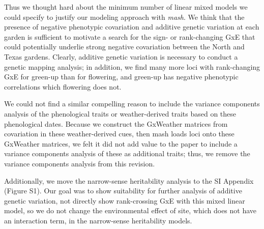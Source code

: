 \documentclass[
  letterpaper,
  DIV=11,
  numbers=noendperiod]{scrartcl}
\begin{document}
Thus we thought hard about the minimum number of linear mixed models we
could specify to justify our modeling approach with \emph{mash}. We
think that the presence of negative phenotypic covariation and additive
genetic variation at each garden is sufficient to motivate a search for
the sign- or rank-changing GxE that could potentially underlie strong
negative covariation between the North and Texas gardens. Clearly,
additive genetic variation is necessary to conduct a genetic mapping
analysis; in addition, we find many more loci with rank-changing GxE for
green-up than for flowering, and green-up has negative phenotypic
correlations which flowering does not.

We could not find a similar compelling reason to include the variance
components analysis of the phenological traits or weather-derived traits
based on these phenological dates. Because we construct the GxWeather
matrices from covariation in these weather-derived cues, then mash loads
loci onto these GxWeather matrices, we felt it did not add value to the
paper to include a variance components analysis of these as additional
traits; thus, we remove the variance components analysis from this
revision.

Additionally, we move the narrow-sense heritability analysis to the SI
Appendix (Figure S1). Our goal was to show suitability for further
analysis of additive genetic variation, not directly show rank-crossing
GxE with this mixed linear model, so we do not change the environmental
effect of site, which does not have an interaction term, in the
narrow-sense heritability models.
\end{document}
